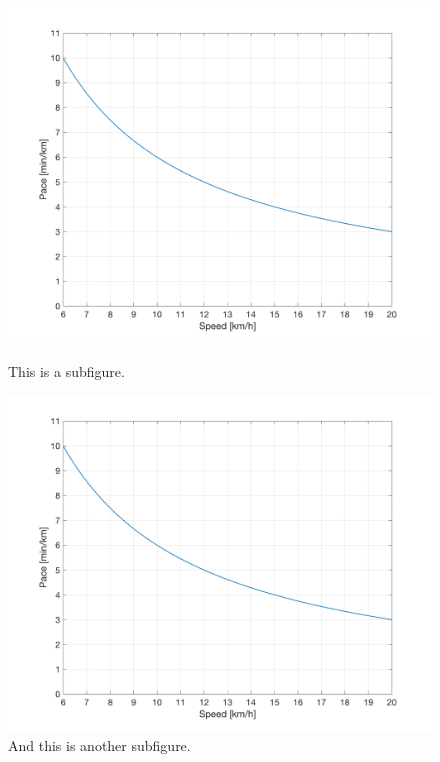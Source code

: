 \begin{figure}[H]
  \begin{minipage}[b]{.5\linewidth}
    \centering
	\includegraphics[width=0.8\linewidth]{Figures/PacevsSpeed.png}
    \caption{This is a subfigure.}
	\label{fig:1a}
  \end{minipage}%
  \begin{minipage}[b]{.5\linewidth}
    \centering
	\includegraphics[width=0.8\linewidth]{Figures/PacevsSpeed.png}
    \caption{And this is another subfigure.}
	\label{fig:1b}
  \end{minipage}
  \label{fig:1}
\end{figure}



\lipsum[1]

